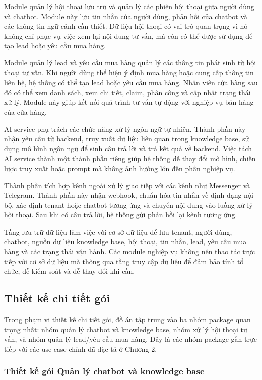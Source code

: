 \documentclass[../DoAn.tex]{subfiles}
\begin{document}
Module quản lý hội thoại lưu trữ và quản lý các phiên hội thoại giữa người dùng và chatbot. Module này lưu tin nhắn của người dùng, phản hồi của chatbot và các thông tin ngữ cảnh cần thiết. Dữ liệu hội thoại có vai trò quan trọng vì nó không chỉ phục vụ việc xem lại nội dung tư vấn, mà còn có thể được sử dụng để tạo lead hoặc yêu cầu mua hàng.

Module quản lý lead và yêu cầu mua hàng quản lý các thông tin phát sinh từ hội thoại tư vấn. Khi người dùng thể hiện ý định mua hàng hoặc cung cấp thông tin liên hệ, hệ thống có thể tạo lead hoặc yêu cầu mua hàng. Nhân viên cửa hàng sau đó có thể xem danh sách, xem chi tiết, claim, phân công và cập nhật trạng thái xử lý. Module này giúp kết nối quá trình tư vấn tự động với nghiệp vụ bán hàng của cửa hàng.

AI service phụ trách các chức năng xử lý ngôn ngữ tự nhiên. Thành phần này nhận yêu cầu từ backend, truy xuất dữ liệu liên quan trong knowledge base, sử dụng mô hình ngôn ngữ để sinh câu trả lời và trả kết quả về backend. Việc tách AI service thành một thành phần riêng giúp hệ thống dễ thay đổi mô hình, chiến lược truy xuất hoặc prompt mà không ảnh hưởng lớn đến phần nghiệp vụ.

Thành phần tích hợp kênh ngoài xử lý giao tiếp với các kênh như Messenger và Telegram. Thành phần này nhận webhook, chuẩn hóa tin nhắn về định dạng nội bộ, xác định tenant hoặc chatbot tương ứng và chuyển nội dung vào luồng xử lý hội thoại. Sau khi có câu trả lời, hệ thống gửi phản hồi lại kênh tương ứng.

Tầng lưu trữ dữ liệu làm việc với cơ sở dữ liệu để lưu tenant, người dùng, chatbot, nguồn dữ liệu knowledge base, hội thoại, tin nhắn, lead, yêu cầu mua hàng và các trạng thái vận hành. Các module nghiệp vụ không nên thao tác trực tiếp với cơ sở dữ liệu mà thông qua tầng truy cập dữ liệu để đảm bảo tính tổ chức, dễ kiểm soát và dễ thay đổi khi cần.

\subsection{Thiết kế chi tiết gói}

Trong phạm vi thiết kế chi tiết gói, đồ án tập trung vào ba nhóm package quan trọng nhất: nhóm quản lý chatbot và knowledge base, nhóm xử lý hội thoại tư vấn, và nhóm quản lý lead/yêu cầu mua hàng. Đây là các nhóm package gắn trực tiếp với các use case chính đã đặc tả ở Chương 2.

\subsubsection{Thiết kế gói Quản lý chatbot và knowledge base}
\end{document}
